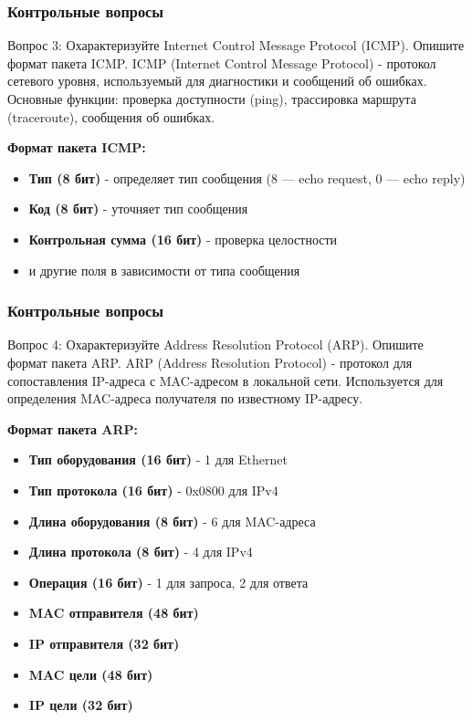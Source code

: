 \begin{frame}
\frametitle{Контрольные вопросы}

\begin{block}{Вопрос 3: Охарактеризуйте Internet Control Message Protocol (ICMP). Опишите формат пакета ICMP.}
ICMP (Internet Control Message Protocol) - протокол сетевого уровня, используемый для диагностики и сообщений об ошибках. Основные функции: проверка доступности (ping), трассировка маршрута (traceroute), сообщения об ошибках.

\textbf{Формат пакета ICMP:}
\begin{itemize}
    \item \textbf{Тип (8 бит)} - определяет тип сообщения (8 — echo request, 0 — echo reply)
    \item \textbf{Код (8 бит)} - уточняет тип сообщения
    \item \textbf{Контрольная сумма (16 бит)} - проверка целостности
    \item и другие поля в зависимости от типа сообщения
\end{itemize}
\end{block}
\end{frame}

\begin{frame}
\frametitle{Контрольные вопросы}

\begin{block}{Вопрос 4: Охарактеризуйте Address Resolution Protocol (ARP). Опишите формат пакета ARP.}
ARP (Address Resolution Protocol) - протокол для сопоставления IP-адреса с MAC-адресом в локальной сети. Используется для определения MAC-адреса получателя по известному IP-адресу.

\textbf{Формат пакета ARP:}
\begin{itemize}
    \item \textbf{Тип оборудования (16 бит)} - 1 для Ethernet
    \item \textbf{Тип протокола (16 бит)} - 0x0800 для IPv4
    \item \textbf{Длина оборудования (8 бит)} - 6 для MAC-адреса
    \item \textbf{Длина протокола (8 бит)} - 4 для IPv4
    \item \textbf{Операция (16 бит)} - 1 для запроса, 2 для ответа
    \item \textbf{MAC отправителя (48 бит)}
    \item \textbf{IP отправителя (32 бит)}
    \item \textbf{MAC цели (48 бит)}
    \item \textbf{IP цели (32 бит)}
\end{itemize}
\end{block}
\end{frame}


